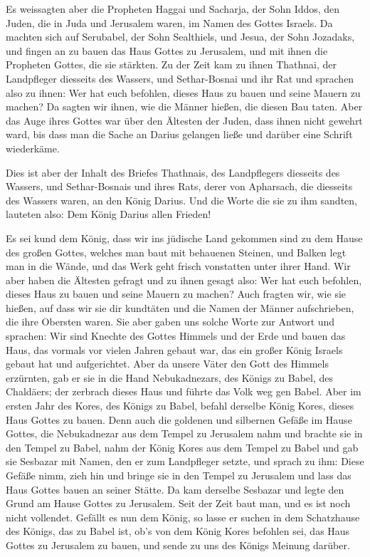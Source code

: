  Es weissagten aber die Propheten Haggai und Sacharja, der
Sohn Iddos, den Juden, die in Juda und Jerusalem waren, im Namen des
Gottes Israels.  Da machten sich auf Serubabel, der Sohn
Sealthiels, und Jesua, der Sohn Jozadaks, und fingen an zu bauen das
Haus Gottes zu Jerusalem, und mit ihnen die Propheten Gottes, die sie
stärkten.  Zu der Zeit kam zu ihnen Thathnai, der
Landpfleger diesseits des Wassers, und Sethar-Bosnai und ihr Rat und
sprachen also zu ihnen: Wer hat euch befohlen, dieses Haus zu bauen und
seine Mauern zu machen?  Da sagten wir ihnen, wie die
Männer hießen, die diesen Bau taten.  Aber das Auge ihres
Gottes war über den Ältesten der Juden, dass ihnen nicht gewehrt ward,
bis dass man die Sache an Darius gelangen ließe und darüber eine Schrift
wiederkäme.

 Dies ist aber der Inhalt des Briefes Thathnais, des
Landpflegers diesseits des Wassers, und Sethar-Bosnais und ihres Rats,
derer von Apharsach, die diesseits des Wassers waren, an den König
Darius.  Und die Worte die sie zu ihm sandten, lauteten
also: Dem König Darius allen Frieden!

 Es sei kund dem König, dass wir ins jüdische Land
gekommen sind zu dem Hause des großen Gottes, welches man baut mit
behauenen Steinen, und Balken legt man in die Wände, und das Werk geht
frisch vonstatten unter ihrer Hand.  Wir aber haben die
Ältesten gefragt und zu ihnen gesagt also: Wer hat euch befohlen, dieses
Haus zu bauen und seine Mauern zu machen?  Auch fragten
wir, wie sie hießen, auf dass wir sie dir kundtäten und die Namen der
Männer aufschrieben, die ihre Obersten waren.  Sie aber
gaben uns solche Worte zur Antwort und sprachen: Wir sind Knechte des
Gottes Himmels und der Erde und bauen das Haus, das vormals vor vielen
Jahren gebaut war, das ein großer König Israels gebaut hat und
aufgerichtet.  Aber da unsere Väter den Gott des Himmels
erzürnten, gab er sie in die Hand Nebukadnezars, des Königs zu Babel,
des Chaldäers; der zerbrach dieses Haus und führte das Volk weg gen
Babel.  Aber im ersten Jahr des Kores, des Königs zu
Babel, befahl derselbe König Kores, dieses Haus Gottes zu bauen.
 Denn auch die goldenen und silbernen Gefäße im Hause
Gottes, die Nebukadnezar aus dem Tempel zu Jerusalem nahm und brachte
sie in den Tempel zu Babel, nahm der König Kores aus dem Tempel zu Babel
und gab sie Sesbazar mit Namen, den er zum Landpfleger setzte,
 und sprach zu ihm: Diese Gefäße nimm, zieh hin und
bringe sie in den Tempel zu Jerusalem und lass das Haus Gottes bauen an
seiner Stätte.  Da kam derselbe Sesbazar und legte den
Grund am Hause Gottes zu Jerusalem. Seit der Zeit baut man, und es ist
noch nicht vollendet.  Gefällt es nun dem König, so lasse
er suchen in dem Schatzhause des Königs, das zu Babel ist, ob's von dem
König Kores befohlen sei, das Haus Gottes zu Jerusalem zu bauen, und
sende zu uns des Königs Meinung darüber.


